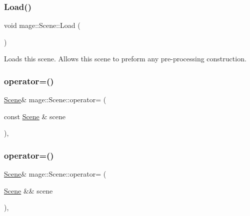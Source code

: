 \subsubsection{\texorpdfstring{Load()}{Load()}}
{\footnotesize\ttfamily void mage\+::\+Scene\+::\+Load (\begin{DoxyParamCaption}{ }\end{DoxyParamCaption})\hspace{0.3cm}{\ttfamily [virtual]}}

Loads this scene. Allows this scene to preform any pre-\/processing construction. \hypertarget{classmage_1_1_scene_a2c25c0fedc0230771d8c00a8288a69ce}{}\label{classmage_1_1_scene_a2c25c0fedc0230771d8c00a8288a69ce} 
\subsubsection{\texorpdfstring{operator=()}{operator=()}\hspace{0.1cm}{\footnotesize\ttfamily [1/2]}}
{\footnotesize\ttfamily \hyperlink{classmage_1_1_scene}{Scene}\& mage\+::\+Scene\+::operator= (\begin{DoxyParamCaption}\item[{const \hyperlink{classmage_1_1_scene}{Scene} \&}]{scene }\end{DoxyParamCaption})\hspace{0.3cm}{\ttfamily [private]}, {\ttfamily [delete]}}

\hypertarget{classmage_1_1_scene_a400926762670c9cd9b6d456291600f53}{}\label{classmage_1_1_scene_a400926762670c9cd9b6d456291600f53} 
\subsubsection{\texorpdfstring{operator=()}{operator=()}\hspace{0.1cm}{\footnotesize\ttfamily [2/2]}}
{\footnotesize\ttfamily \hyperlink{classmage_1_1_scene}{Scene}\& mage\+::\+Scene\+::operator= (\begin{DoxyParamCaption}\item[{\hyperlink{classmage_1_1_scene}{Scene} \&\&}]{scene }\end{DoxyParamCaption})\hspace{0.3cm}{\ttfamily [private]}, {\ttfamily [delete]}}

